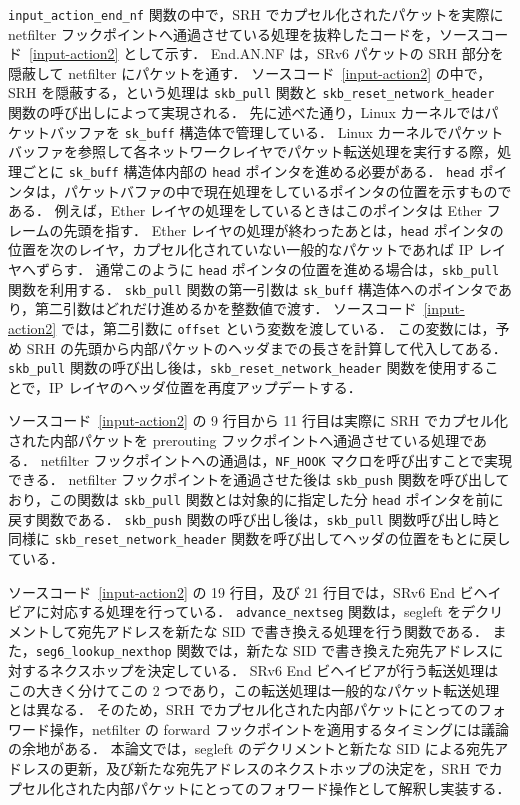 \texttt{input\_action\_end\_nf} 関数の中で，SRH でカプセル化されたパケットを実際に netfilter フックポイントへ通過させている処理を抜粋したコードを，ソースコード~\ref*{input-action2} として示す．
End.AN.NF は，SRv6 パケットの SRH 部分を隠蔽して netfilter にパケットを通す．
ソースコード~\ref*{input-action2} の中で，SRH を隠蔽する，という処理は \texttt{skb\_pull} 関数と \texttt{skb\_reset\_network\_header} 関数の呼び出しによって実現される．
先に述べた通り，Linux カーネルではパケットバッファを \texttt{sk\_buff} 構造体で管理している．
Linux カーネルでパケットバッファを参照して各ネットワークレイヤでパケット転送処理を実行する際，処理ごとに \texttt{sk\_buff} 構造体内部の \texttt{head} ポインタを進める必要がある．
\texttt{head} ポインタは，パケットバファの中で現在処理をしているポインタの位置を示すものである．
例えば，Ether レイヤの処理をしているときはこのポインタは Ether フレームの先頭を指す．
Ether レイヤの処理が終わったあとは，\texttt{head} ポインタの位置を次のレイヤ，カプセル化されていない一般的なパケットであれば IP レイヤへずらす．
通常このように \texttt{head} ポインタの位置を進める場合は，\texttt{skb\_pull} 関数を利用する．
\texttt{skb\_pull} 関数の第一引数は \texttt{sk\_buff} 構造体へのポインタであり，第二引数はどれだけ進めるかを整数値で渡す．
ソースコード~\ref*{input-action2} では，第二引数に \texttt{offset} という変数を渡している．
この変数には，予め SRH の先頭から内部パケットのヘッダまでの長さを計算して代入してある．
\texttt{skb\_pull} 関数の呼び出し後は，\texttt{skb\_reset\_network\_header} 関数を使用することで，IP レイヤのヘッダ位置を再度アップデートする．

ソースコード~\ref*{input-action2} の 9 行目から 11 行目は実際に SRH でカプセル化された内部パケットを prerouting フックポイントへ通過させている処理である．
netfilter フックポイントへの通過は，\texttt{NF\_HOOK} マクロを呼び出すことで実現できる．
netfilter フックポイントを通過させた後は \texttt{skb\_push} 関数を呼び出しており，この関数は \texttt{skb\_pull} 関数とは対象的に指定した分 \texttt{head} ポインタを前に戻す関数である．
\texttt{skb\_push} 関数の呼び出し後は，\texttt{skb\_pull} 関数呼び出し時と同様に \texttt{skb\_reset\_network\_header} 関数を呼び出してヘッダの位置をもとに戻している．

ソースコード~\ref*{input-action2} の 19 行目，及び 21 行目では，SRv6 End ビヘイビアに対応する処理を行っている．
\texttt{advance\_nextseg} 関数は，segleft をデクリメントして宛先アドレスを新たな SID で書き換える処理を行う関数である．
また，\texttt{seg6\_lookup\_nexthop} 関数では，新たな SID で書き換えた宛先アドレスに対するネクスホップを決定している．
SRv6 End ビヘイビアが行う転送処理はこの大きく分けてこの 2 つであり，この転送処理は一般的なパケット転送処理とは異なる．
そのため，SRH でカプセル化された内部パケットにとってのフォワード操作，netfilter の forward フックポイントを適用するタイミングには議論の余地がある．
本論文では，segleft のデクリメントと新たな SID による宛先アドレスの更新，及び新たな宛先アドレスのネクストホップの決定を，SRH でカプセル化された内部パケットにとってのフォワード操作として解釈し実装する．

